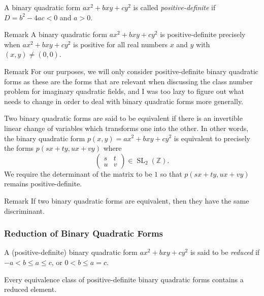 \documentclass[handout]{beamer}
\begin{document}
\begin{frame}
	
	\begin{definition}
		A binary quadratic form $ax^2 + bxy + cy^2$ is called \emph{positive-definite} if $D = b^2 - 4ac < 0$ and $a > 0$.
	\end{definition}
	\pause

	\begin{block}{Remark}
		A binary quadratic form $ax^2 + bxy + cy^2$ is positive-definite precisely when $ax^2 + bxy + cy^2$ is positive for all real numbers $x$ and $y$ with $(x, y) \neq (0, 0)$.
	\end{block}
	\pause

	\begin{block}{Remark}
		For our purposes, we will only consider positive-definite binary quadratic forms as these are the forms that are relevant when discussing the class number problem for imaginary quadratic fields, and I was too lazy to figure out what needs to change in order to deal with binary quadratic forms more generally.
	\end{block}

\end{frame}

\begin{frame}
	
	\begin{definition}[Equivalence]
		Two binary quadratic forms are said to be equivalent if there is an invertible linear change of variables which transforms one into the other. In other words, the binary quadratic form $p(x, y) = ax^2 + bxy + cy^2$ is equivalent to precisely the forms $p(sx + ty, ux + vy)$ where
		\[
			\begin{pmatrix} s & t \\ u & v \end{pmatrix} \in \operatorname{SL}_2(\mathbb{Z}).
		\]
		We require the determinant of the matrix to be $1$ so that $p(sx + ty, ux + vy)$ remains positive-definite.
	\end{definition}

	\begin{block}{Remark}
		If two binary quadratic forms are equivalent, then they have the same discriminant.
	\end{block}

\end{frame}

\begin{frame}

	\frametitle{Reduction of Binary Quadratic Forms}

	\begin{definition}
		A (positive-definite) binary quadratic form $ax^2 + bxy + cy^2$ is said to be \emph{reduced} if $-a < b \leq a \leq c$, or $0 < b \leq a = c$.
	\end{definition}
	\pause

	\begin{theorem}
		Every equivalence class of positive-definite binary quadratic forms contains a reduced element.
	\end{theorem}

\end{frame}
\end{document}
